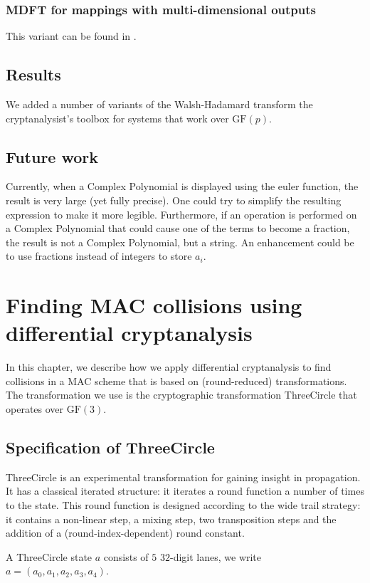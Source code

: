 \documentclass{report}
\newcommand{\GF}{\text{GF}}
\newcommand{\ThreeCircle}{{\sc ThreeCircle} }
\begin{document}
\subsection{MDFT for mappings with multi-dimensional outputs}

This variant can be found in .

\section{Results}
We added a number of variants of the Walsh-Hadamard transform the cryptanalysist's toolbox for systems that work over $\GF(p)$.

\section{Future work}
Currently, when a Complex Polynomial is displayed using the euler function, the result is very large (yet fully precise). One could try to simplify the resulting expression to make it more legible. Furthermore, if an operation is performed on a Complex Polynomial that could cause one of the terms to become a fraction, the result is not a Complex Polynomial, but a string. An enhancement could be to use fractions instead of integers to store $a_i$.

\chapter{Finding MAC collisions using differential cryptanalysis}
In this chapter, we describe how we apply differential cryptanalysis to find collisions in a MAC scheme that is based on (round-reduced) transformations. The transformation we use is the cryptographic transformation \ThreeCircle that operates over $\GF(3)$.

\section{Specification of \ThreeCircle}
\ThreeCircle is an experimental transformation for gaining insight in propagation.
It has a classical iterated structure: it iterates a round function a number of times to the state. This round function is designed according to the wide trail strategy: it contains a non-linear step, a mixing step, two transposition steps and the addition of a (round-index-dependent) round constant. 

A \ThreeCircle state $a$ consists of $5$ $32$-digit lanes, we write $a = (a_0,a_1,a_2,a_3,a_4)$. 
\end{document}
